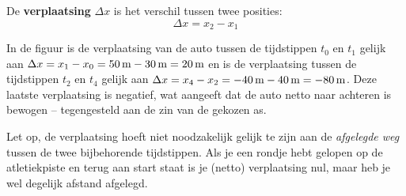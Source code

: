 \documentclass{ximera}
\begin{document}
\begin{definition}
De \textbf{verplaatsing} \(\Delta x\) is het verschil tussen twee posities:
\[
	\Delta x = x_2-x_1
\]


\begin{image}
\end{image}
\end{definition}

In de figuur is de verplaatsing van de auto tussen de tijdstippen $t_0$ en $t_1$ gelijk aan $\Delta x = x_1-x_0=50\rm\,m-30\rm\,m=20\rm\,m$ en is de verplaatsing tussen de tijdstippen $t_2$ en $t_4$ gelijk aan $\Delta x=x_4-x_2=-40\rm\,m-40\rm\,m=-80\rm\,m$. Deze laatste verplaatsing is negatief, wat aangeeft dat de auto netto naar achteren is bewogen -- tegengesteld aan de zin van de gekozen as.

Let op, de verplaatsing hoeft niet noodzakelijk gelijk te zijn aan de \emph{afgelegde weg} tussen de twee bijbehorende tijdstippen. Als je een rondje hebt gelopen op de atletiekpiste en terug aan start staat is je (netto) verplaatsing nul, maar heb je wel degelijk afstand afgelegd.

	
\end{document}
